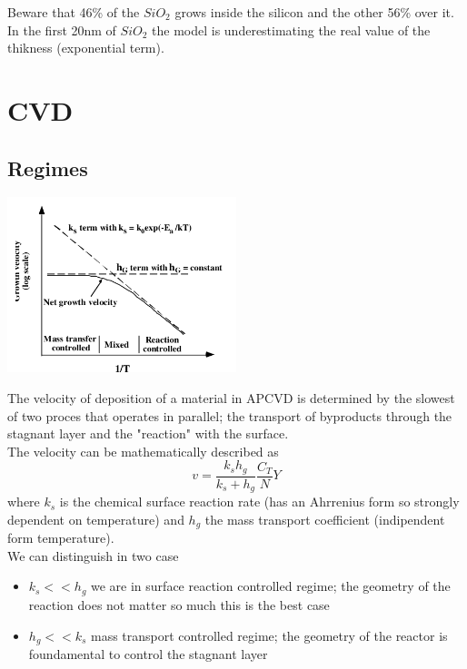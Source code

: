 Beware that 46\% of the $SiO_2$ grows inside the silicon and the other 56\% over it.\\
\vspace{5mm}
In the first 20nm of $SiO_2$ the model is underestimating the real value of the thikness (exponential term).\\


\section{CVD}

\subsection{Regimes}

\centering
\includegraphics[width=0.5\textwidth]{CVD.png}\\
\raggedright

The velocity of deposition of a material in APCVD is determined by the slowest of two proces that operates in parallel; the transport of byproducts through the stagnant layer and the "reaction" with the surface.\\
The velocity can be mathematically described as 
\begin{equation}
v=\frac{k_sh_g}{k_s+h_g}\frac{C_T}{N}Y
\end{equation}
where $k_s$ is the chemical surface reaction rate (has an Ahrrenius form so strongly dependent on temperature) and $h_g$ the mass transport coefficient (indipendent form temperature).\\
We can distinguish in two case 
\begin{itemize}
\item $k_s<<h_g$ we are in surface reaction controlled regime; the geometry of the reaction does not matter so much this is the best case
\item $h_g<<k_s$ mass transport controlled regime; the geometry of the reactor is foundamental to control the stagnant layer 
\end{itemize}



